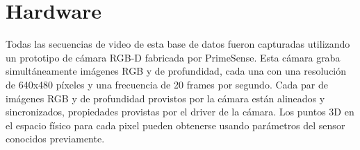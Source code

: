 \section{Hardware}
Todas las secuencias de video de esta base de datos fueron capturadas utilizando un prototipo de cámara RGB-D fabricada por PrimeSense. Esta cámara graba simultáneamente imágenes RGB y de profundidad, cada una con una resolución de 640x480 píxeles y una frecuencia de 20 frames por segundo. Cada par de imágenes RGB y de profundidad provistos por la cámara están alineados y sincronizados, propiedades provistas por el driver de la cámara. Los puntos 3D en el espacio físico para cada pixel pueden obtenerse usando parámetros del sensor conocidos previamente.
